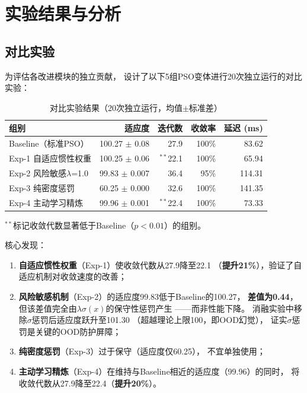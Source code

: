 \section{实验结果与分析}

\subsection{对比实验}

为评估各改进模块的独立贡献，
设计了以下5组PSO变体进行20次独立运行的对比实验：

\begin{table}[H]
\centering
\caption{对比实验结果（20次独立运行，均值$\pm$标准差）}
\begin{tabular}{lrrrr}
\toprule
组别 & 适应度 & 迭代数 & 收敛率 & 延迟 (ms) \\
\midrule
Baseline（标准PSO） & 100.27 $\pm$ 0.08 & 27.9 & 100\% & 83.62 \\
Exp-1 自适应惯性权重 & 100.25 $\pm$ 0.06 & $^{**}$22.1 & 100\% & 65.94 \\
Exp-2 风险敏感$\lambda$=1.0 & 99.83 $\pm$ 0.007 & 36.4 & 95\% & 114.31 \\
Exp-3 纯密度惩罚 & 60.25 $\pm$ 0.000 & 32.6 & 100\% & 141.35 \\
Exp-4 主动学习精炼 & 99.96 $\pm$ 0.001 & $^{**}$22.4 & 100\% & 73.33 \\
\bottomrule
\end{tabular}
\label{tab:comparison}
\end{table}

$^{**}$标记收敛代数显著低于Baseline（$p < 0.01$）的组别。

核心发现：
\begin{enumerate}
    \item \textbf{自适应惯性权重}（Exp-1）使收敛代数从27.9降至22.1
        （\textbf{提升21\%}），验证了自适应机制对收敛速度的改善；
    \item \textbf{风险敏感机制}（Exp-2）的适应度99.83低于Baseline的100.27，
        \textbf{差值为0.44}，但该差值完全由$\lambda\sigma(x)$的保守性惩罚产生
        ——而非性能下降。
        消融实验中移除$\sigma$惩罚后适应度跃升至101.30
        （超越理论上限100，即OOD幻觉），
        证实$\sigma$惩罚是关键的OOD防护屏障；
    \item \textbf{纯密度惩罚}（Exp-3）过于保守（适应度仅60.25），
        不宜单独使用；
    \item \textbf{主动学习精炼}（Exp-4）在维持与Baseline相近的适应度（99.96）的同时，
        将收敛代数从27.9降至22.4（\textbf{提升20\%}）。
\end{enumerate}

